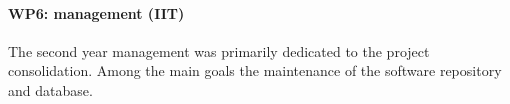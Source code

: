 \paragraph{WP6: management (IIT)}

The second year management was primarily dedicated to the project consolidation. Among the main goals the maintenance of the software repository and database.
